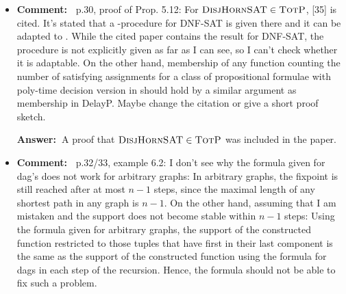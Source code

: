 \documentclass[a4paper]{article}
\newcommand{\ans}{{\bf Answer:\ }}
\newcommand{\cm}[1]{{\bf Comment:\ } #1}
\begin{document}
\begin{itemize}
	\item \cm{p.30, proof of Prop. 5.12: For $\textsc{DisjHornSAT} \in \text{\sc TotP}$, [35] is cited. It’s stated that a \totp-procedure for DNF-SAT is given there and it can be adapted to \dhsat. While the cited paper contains the result for DNF-SAT, the procedure is not explicitly given as far as I can see, so I can't check whether it is adaptable. On the other hand, membership of any function counting the number of satisfying assignments for a class of propositional formulae with poly-time decision version in \totp should hold by a similar argument as membership in DelayP. Maybe change the citation or give a short proof sketch.}
	
	\ans A proof that $\textsc{DisjHornSAT} \in \text{\sc TotP}$ was included in  the paper.
	
	\item \cm{p.32/33, example 6.2: I don't see why the formula given for dag's does not work for arbitrary graphs: In arbitrary graphs, the fixpoint is still reached after at most $n-1$ steps, since the maximal length of any shortest path in any graph is $n-1$. On the other hand, assuming that I am mistaken and the support does not become stable within $n-1$ steps: Using the formula	given for arbitrary graphs, the support of the constructed function restricted to those tuples that have first in their last component is the same as the support of the constructed function using the formula for dags in each step of the recursion. Hence, the formula should not be able to fix such a problem.}
	

\end{itemize}
\end{document}

